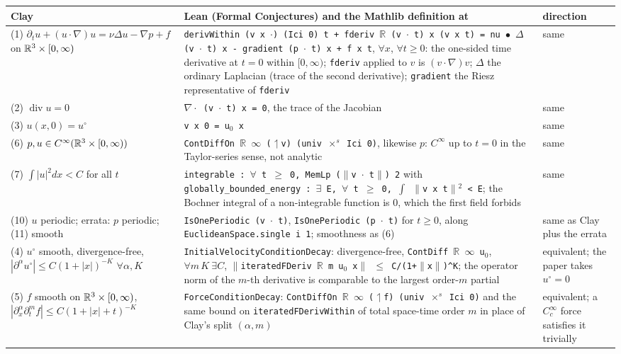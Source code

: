 \documentclass[11pt]{article}
\newcommand{\lean}[1]{\texttt{#1}}
\begin{document}
\begin{table}[t]\centering\footnotesize
\begin{tabular}{L{3.3cm}L{8.6cm}L{2.6cm}}\toprule
Clay & Lean (Formal Conjectures) and the Mathlib definition at \lean{\MathlibRev} & direction\\\midrule
(1) $\partial_tu+(u\cdot\nabla)u=\nu\Delta u-\nabla p+f$ on $\mathbb{R}^3\times[0,\infty)$ &
\lean{derivWithin (v x $\cdot$) (Ici 0) t + fderiv $\mathbb{R}$ (v $\cdot$ t) x (v x t) = nu $\bullet$ $\Delta$ (v $\cdot$ t) x - gradient (p $\cdot$ t) x + f x t}, $\forall x$, $\forall t\ge0$: the one-sided time derivative at $t=0$ within $[0,\infty)$; \lean{fderiv} applied to $v$ is $(v\cdot\nabla)v$; \lean{$\Delta$} the ordinary Laplacian (trace of the second derivative); \lean{gradient} the Riesz representative of \lean{fderiv} & same \\
(2) $\operatorname{div}u=0$ & \lean{$\nabla\!\cdot$ (v $\cdot$ t) x = 0}, the trace of the Jacobian & same \\
(3) $u(x,0)=u^\circ$ & \lean{v x 0 = u$_0$ x} & same \\
(6) $p,u\in C^\infty(\mathbb{R}^3\times[0,\infty))$ & \lean{ContDiffOn $\mathbb{R}$ $\infty$ ($\upharpoonleft$v) (univ $\times^{s}$ Ici 0)}, likewise $p$: $C^\infty$ up to $t=0$ in the Taylor-series sense, not analytic & same \\
(7) $\int|u|^2dx<C$ for all $t$ & \lean{integrable : $\forall$ t $\ge$ 0, MemLp ($\|$v $\cdot$ t$\|$) 2} with \lean{globally\_bounded\_energy : $\exists$ E, $\forall$ t $\ge$ 0, $\int$ $\|$v x t$\|$$^2$ < E}; the Bochner integral of a non-integrable function is $0$, which the first field forbids & same \\
(10) $u$ periodic; errata: $p$ periodic; (11) smooth & \lean{IsOnePeriodic (v $\cdot$ t)}, \lean{IsOnePeriodic (p $\cdot$ t)} for $t\ge0$, along \lean{EuclideanSpace.single i 1}; smoothness as (6) & same as Clay plus the errata \\
(4) $u^\circ$ smooth, divergence-free, $|\partial^\alpha u^\circ|\le C(1+|x|)^{-K}$ $\forall\alpha,K$ & \lean{InitialVelocityConditionDecay}: divergence-free, \lean{ContDiff $\mathbb{R}$ $\infty$ u$_0$}, $\forall m\,K\ \exists C$, \lean{$\|$iteratedFDeriv $\mathbb{R}$ m u$_0$ x$\|$ $\le$ C/(1+$\|$x$\|$)\^{}K}; the operator norm of the $m$-th derivative is comparable to the largest order-$m$ partial & equivalent; the paper takes $u^\circ=0$ \\
(5) $f$ smooth on $\mathbb{R}^3\times[0,\infty)$, $|\partial_x^\alpha\partial_t^mf|\le C(1+|x|+t)^{-K}$ & \lean{ForceConditionDecay}: \lean{ContDiffOn $\mathbb{R}$ $\infty$ ($\upharpoonleft$f) (univ $\times^{s}$ Ici 0)} and the same bound on \lean{iteratedFDerivWithin} of total space-time order $m$ in place of Clay's split $(\alpha,m)$ & equivalent; a $C_c^\infty$ force satisfies it trivially \\

\end{tabular}
\end{table}
\end{document}
